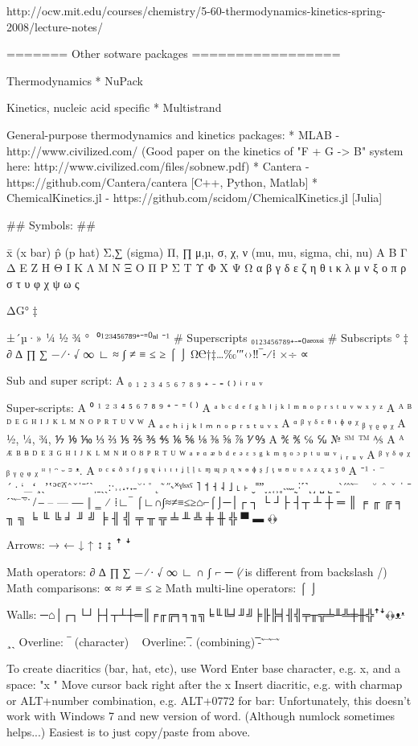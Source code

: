 http://ocw.mit.edu/courses/chemistry/5-60-thermodynamics-kinetics-spring-2008/lecture-notes/




======= Other sotware packages =================


Thermodynamics
* NuPack


Kinetics, nucleic acid specific
* Multistrand

General-purpose thermodynamics and kinetics packages:
* MLAB - http://www.civilized.com/ (Good paper on the kinetics of "F + G -> B" system here: http://www.civilized.com/files/sobnew.pdf)
* Cantera - https://github.com/Cantera/cantera   [C++, Python, Matlab]
* ChemicalKinetics.jl - https://github.com/scidom/ChemicalKinetics.jl  [Julia]



## Symbols: ##

    x̄  (x bar)
    p̂  (p hat)
    Σ,∑  (sigma)
    Π, ∏
    μ,µ, σ, χ, ν (mu, mu, sigma, chi, nu)
    Α Β Γ Δ Ε Ζ Η Θ Ι Κ Λ Μ Ν Ξ Ο Π Ρ Σ Τ Υ Φ Χ Ψ Ω
    α β γ δ ε ζ η θ ι κ λ μ ν ξ ο π ρ σ τ υ φ χ ψ ω ς

    ΔG°
    ‡

    ±´µ·» ¼ ½ ¾ ° ­
    ⁰¹²³⁴⁵⁶⁷⁸⁹⁺⁻⁼⁽⁾ⁿⁱ  ⁻¹       # Superscripts
    ₀₁₂₃₄₅₆₇₈₉₊₋₌₍₎ₐₑₒₓₔᵢ       # Subscripts
    ° ‡
    ∂ ∆ ∏ ∑ − ∕ ∙ √ ∞ ∟ ≈ ∫ ≠ ≡ ≤ ≥ ⌠ ⌡
    Ω℮†‡…‰′″‹›‼‾⁃⁄⁞
    ×÷ ∝

    Sub and super script:
    A ₀ ₁ ₂ ₃ ₄ ₅ ₆ ₇ ₈ ₉ ₊ ₋ ₌ ₍ ₎ ᵢ ᵣ ᵤ ᵥ

    Super-scripts:
    A ⁰ ¹ ² ³ ⁴ ⁵ ⁶ ⁷ ⁸ ⁹ ⁺ ⁻ ⁼ ⁽ ⁾
    A ᵃ ᵇ ᶜ ᵈ ᵉ ᶠ ᵍ ʰ ⁱ ʲ ᵏ ˡ ᵐ ⁿ ᵒ ᵖ ʳ ˢ ᵗ ᵘ ᵛ ʷ ˣ ʸ ᶻ
    A ᴬ ᴮ ᴰ ᴱ ᴳ ᴴ ᴵ ᴶ ᴷ ᴸ ᴹ ᴺ ᴼ ᴾ ᴿ ᵀ ᵁ ⱽ ᵂ
    A ₐ ₑ ₕ ᵢ ⱼ ₖ ₗ ₘ ₙ ₒ ₚ ᵣ ₛ ₜ ᵤ ᵥ ₓ
    A ᵅ ᵝ ᵞ ᵟ ᵋ ᶿ ᶥ ᶲ ᵠ ᵡ ᵦ ᵧ ᵨ ᵩ ᵪ
    A ½, ¼, ¾, ⅐ ⅑ ⅒ ⅓ ⅔ ⅕ ⅖ ⅗ ⅘ ⅙ ⅚ ⅛ ⅜ ⅝ ⅞ ⅟ ↉
    A ℀ ℁ ℅ ℆ № ℠ ™ ⅍
    A ᴬ ᴭ ᴮ ᴯ ᴰ ᴱ ᴲ ᴳ ᴴ ᴵ ᴶ ᴷ ᴸ ᴹ ᴺ ᴻ ᴼ ᴽ ᴾ ᴿ ᵀ ᵁ ᵂ ᵃ ᵄ ᵅ ᵆ ᵇ ᵈ ᵉ ᵊ ᵋ ᵌ ᵍ ᵏ ᵐ ᵑ ᵒ ᵓ ᵖ ᵗ ᵘ ᵚ ᵛ ᵢ ᵣ ᵤ ᵥ
    A ᵝ ᵞ ᵟ ᵠ ᵡ ᵦ ᵧ ᵨ ᵩ ᵪ ᵸ ᵎ ᵔ ᵕ ᵙ ᵜ.
    A ᶛ ᶜ ᶝ ᶞ ᶟ ᶠ ᶡ ᶢ ᶣ ᶤ ᶥ ᶦ ᶧ ᶨ ᶩ ᶪ ᶫ ᶬ ᶭ ᶮ ᶯ ᶰ ᶱ ᶲ ᶳ ᶴ ᶵ ᶶ ᶷ ᶸ ᶹ ᶺ ᶻ ᶼ ᶽ ᶾ ᶿ
    A ⁻¹
 ˑ
    ¯´·`_ʻ¸ˎʼʽʾʿˀˁˆˇˈˉˊˋˌˍˎˏːˑ˒˓˔˕˖˗˘˙˚˛˜˝˞˟ˠˡˢˣˤ ˥ ˦ ˧ ˨ ˩ ˪ ˫ ˬ˭ˮ˯˰˱˲˳˴˵˶˷˸˹˺˻˼ ˽ ˾ ˿ ̀  ́ ̂ ̃ ̄
    ~ ˘ ˆ ˇ  ˈ ˉ ˊˋ ̃ ̄  ̅  ̆  ̇
    ̸
    ‒ – — ―  ‖ ‗
    ⁄ ⁞∟‾ ⌠∟∩∫≈≠≡≤≥⌂⌐⌠⌡─│┌ ┐ └ ┘├ ┤┬ ┴ ┼ ═ ║ ╒ ╓ ╔ ╕ ╖ ╗ ╘ ╙ ╚ ╛ ╜ ╝ ╞ ╢ ╣ ╤ ╥ ╦ ╧ ╨ ╩ ╪ ╫ ╬  ▀ ▬ ﴾﴿

    Arrows:
        → ← ↓ ↑ ↕ ↨ ꜛ ꜜ

    Math operators:
         ∂ ∆ ∏ ∑  − ∕ ∙ √ ∞ ∟ ∩ ∫ ⌐ ─  (∕ is different from backslash /)
    Math comparisons:
        ∝ ≈ ≠ ≡  ≤ ≥
    Math multi-line operators:
        ⌠
        ⌡

    Walls:
    ─⌂│┌┐└┘├┤┬┴┼═║╒╓╔╕╕╖╗╘╙╚╛╜╝╞╟╠╡╢╣╤╥╦╧╨╩╪╫╬ꜛꜜ﴾﴿ᴥᵜ

        ¸ˎ
        Overline: ‾  (character)  ~
        Overline: ̅.  (combining)  ̅-  ̃ ̄  ̃  ̄   ̃


To create diacritics (bar, hat, etc), use Word
    Enter base character, e.g. x, and a space: "x "
    Move cursor back right after the x
    Insert diacritic, e.g. with charmap or ALT+number combination, e.g. ALT+0772 for bar:
    Unfortunately, this doesn't work with Windows 7 and new version of word.
    (Although numlock sometimes helps...)
    Easiest is to just copy/paste from above.
